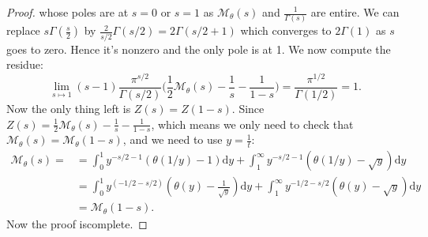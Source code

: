\documentclass[12pt,a4paper,english]{article}
\theoremstyle{plain}
\theoremstyle{definition}
\begin{document}
\begin{proof}
whose poles are at $s=0$ or $s=1$ as $\mathcal{M}_{\theta}(s) $ and $\frac{1}{\Gamma(s)}$ are entire. We can replace $s\Gamma(\frac{s}{2})$ by $\frac{2}{s/2}\Gamma(s/2)=2\Gamma(s/2+1)$ which converges to $2\Gamma(1)$ as $s$ goes to zero. Hence it's nonzero and the only pole is at 1. We now compute the residue:
\begin{equation*}
    \lim_{s\mapsto 1}(s-1)\frac{\pi^{s/2}}{\Gamma(s/2)}\bigg(\frac{1}{2}\mathcal{M}_{\theta}(s)-\frac{1}{s}-\frac{1}{1-s}\bigg)=\frac{\pi^{1/2}}{\Gamma(1/2)}=1.
\end{equation*}
Now the only thing left is $Z(s)=Z(1-s)$. Since $Z(s)=\frac{1}{2}\mathcal{M}_{\theta}(s)-\frac{1}{s}-\frac{1}{1-s}$, which means we only need to check that $\mathcal{M}_{\theta}(s)=\mathcal{M}_{\theta}(1-s)$, and we need to use $y=\frac{1}{t}$:
\begin{align*}
        \mathcal{M}_{\theta}(s)=
        &= \int^{1}_{0}y^{-s/2-1}(\theta(1/y)-1)\text{d}y+\int^{\infty}_{1}y^{-s/2-1}(\theta(1/y)-\sqrt{y})\text{d}y\\
        &= \int^{1}_{0}y^{(-1/2-s/2)}(\theta(y)-\frac{1}{\sqrt{y}})\text{d}y+\int^{\infty}_{1}y^{-1/2-s/2}(\theta(y)-\sqrt{y})\text{d}y\\
        &=\mathcal{M}_{\theta}(1-s).
\end{align*}
Now the proof iscomplete.
\end{proof}
\end{document}
